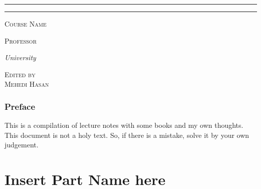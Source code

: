 \documentclass[12pt,oneside]{book}
\newcommand{\course}{Course Name}
\newcommand{\prof}{Professor}
\begin{document}
\begin{titlepage}
    \vspace{0.6\baselineskip}
    
    \rule{345pt}{0.4pt}\vspace*{-\baselineskip}\vspace{3.2pt}
    \rule{345pt}{1.6pt}
    
    \vspace{2\baselineskip} %
    
    
    {\scshape \Large{\course}} 
    
    \vspace*{5\baselineskip} %
    
    
    
    \vspace{0.5\baselineskip} 
    
    {\scshape   \Large \prof\\ } %
    
    \vspace{0.75\baselineskip} 
    
    {\textit{\large University}} 
    
    \vfill 
    
    \vspace{0.3\baselineskip} 
    
    
    {\scshape \large Edited by\\  Mehedi Hasan} 
    \vspace*{40pt}
    \end{titlepage}
    \newpage
    \section*{Preface}
    This is a compilation of lecture notes with some books and my own thoughts. This document is not a holy text. So, if there is a mistake, solve it by your own judgement.
    \newpage
    \tableofcontents
    \newpage
    \part{Insert Part Name here}
    
\end{document}
